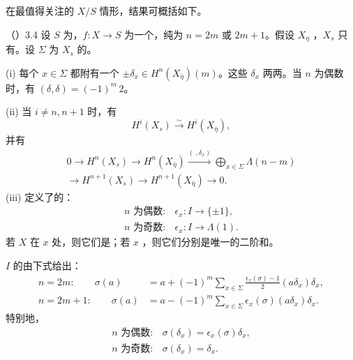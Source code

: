 在最值得关注的 $X/S$ 情形，结果可概括如下。
\begin{SGAresult}{（）}{3.4}
设 $S$ 为，$f:X\to S$ 为一个，纯为 $n=2m$ 或 $2m+1$。假设 $X_\eta$ ，$X_s$ 只有。设 $\Sigma$ 为 $X_s$ 的。

(i) 每个 $x\in\Sigma$ 都附有一个 $\pm\delta_x\in H^n(X_{\bar\eta})(m)$。这些 $\delta_x$ 两两。当 $n$ 为偶数时，有 $(\delta,\delta)=(-1)^m\,2$。

(ii) 当 $i\ne n,n+1$ 时，有
\[
 H^i(X_s)\xrightarrow{\sim}H^i(X_{\bar\eta}),
\]
并有
\[
\begin{gathered}
0\longrightarrow H^n(X_s)\longrightarrow H^n(X_{\bar\eta})
 \xrightarrow{(\ ,\delta_x)}\bigoplus_{x\in\Sigma}\Lambda(n-m)\\
 \longrightarrow H^{n+1}(X_s)\longrightarrow H^{n+1}(X_{\bar\eta})\longrightarrow0.
\end{gathered}
\]
(iii) 定义了的：
\[
\begin{array}{lll}
n\text{ 为偶数}:&\epsilon_x:I\longrightarrow\{\pm1\},\\[2pt]
n\text{ 为奇数}:&\epsilon_x:I\longrightarrow\Lambda(1).
\end{array}
\]
若 $X$ 在 $x$ 处，则它们是；若 $x$ ，则它们分别是唯一的二阶和。

 $I$ 的由下式给出：
\[
\begin{aligned}
n=2m:\qquad
 \sigma(a)&=a+(-1)^m\sum_{x\in\Sigma}\frac{\epsilon_x(\sigma)-1}{2}(a\delta_x)\delta_x,\\
n=2m+1:\qquad
 \sigma(a)&=a-(-1)^m\sum_{x\in\Sigma}\epsilon_x(\sigma)(a\delta_x)\delta_x.
\end{aligned}
\]
特别地，
\[
\begin{array}{lll}
n\text{ 为偶数}:&\sigma(\delta_x)=\epsilon_x(\sigma)\delta_x,\\[2pt]
n\text{ 为奇数}:&\sigma(\delta_x)=\delta_x.
\end{array}
\]
\end{SGAresult}
